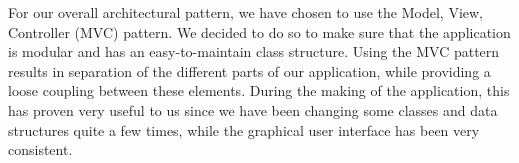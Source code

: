 For our overall architectural pattern, we have chosen to use the Model, View, Controller (MVC) pattern. We decided to do so to make sure that the application is modular and has an easy-to-maintain class structure. Using the MVC pattern results in separation of the different parts of our application, while providing a loose coupling between these elements. During the making of the application, this has proven very useful to us since we have been changing some classes and data structures quite a few times, while the graphical user interface has been very consistent.